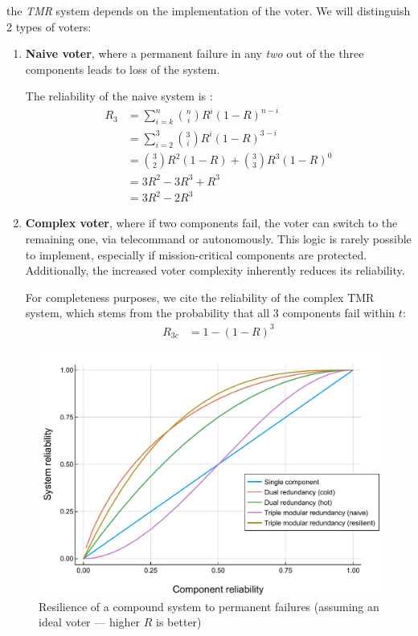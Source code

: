 \documentclass[a4paper,nobib,final]{tufte-book}
\begin{document}
 
 the \emph{\ac{TMR}} system depends on the implementation of the voter. We will distinguish 2 types of voters:
\begin{enumerate}
	\item \textbf{Naive voter}, where a permanent failure in any \emph{two} out of the three components leads to loss of the system.
	
	The reliability of the naive system is \autocite[31]{birolini_reliability_engineering_2004}:
	\begin{align}
	R_3 &= \sum_{i=k}^{n} \binom{n}{i} R^i (1-R)^{n-i}\nonumber\\
	&= \sum_{i=2}^{3} \binom{3}{i} R^i (1-R)^{3-i} \nonumber\\
	&= \binom{3}{2} R^2 (1-R) + \binom{3}{3} R^3 (1-R)^0 \nonumber\\
	&= 3R^2 - 3R^3 + R^3 \nonumber\\
	&= 3R^2 - 2R^3
	\label{eq:tmr}
	\end{align}
	
	\item \textbf{Complex voter}, where if two components fail, the voter can switch to the remaining one, via telecommand or autonomously. This logic is rarely possible to implement, especially if mission-critical components are protected. Additionally, the increased voter complexity inherently reduces its reliability.
	
	For completeness purposes, we cite the reliability of the complex \acs{TMR} system, which stems from the probability that all 3 components fail within \( t \):
	\begin{align}
	R_{3c} &= 1 - (1 - R)^3
	\label{eq:tmr_complex}
	\end{align}
\end{enumerate}


\begin{figure}
	\centering
	\includegraphics{analysis/reliability_norepair_en}
	\caption[Resilience of a compound system to permanent failures (assuming an ideal voter)]{Resilience of a compound system to permanent failures (assuming an ideal voter --- higher \(R\) is better)}
	\label{fig:reliability_norepair}
\end{figure}
\end{document}

